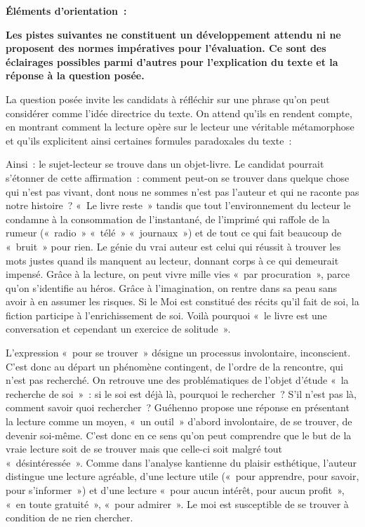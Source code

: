 {\bigskip

\textbf{Éléments d'orientation~:}

\textbf{Les pistes suivantes ne constituent un développement attendu ni ne proposent des
normes impératives pour l'évaluation. Ce sont des éclairages possibles parmi d'autres
pour l'explication du texte et la réponse à la question posée.}

La question posée invite les candidats à réfléchir sur une phrase qu'on peut considérer
comme l'idée directrice du texte. On attend qu'ils en rendent compte, en montrant comment la
lecture opère sur le lecteur une véritable métamorphose et qu'ils explicitent ainsi certaines
formules paradoxales du texte~:

Ainsi~: le sujet-lecteur se trouve dans un objet-livre. Le candidat pourrait s'étonner de cette
affirmation~: comment peut-on se trouver dans quelque chose qui n'est pas vivant, dont nous ne
sommes n'est pas l'auteur et qui ne raconte pas notre histoire~? «~Le livre reste~» tandis que tout
l'environnement du lecteur le condamne à la consommation de l'instantané, de l'imprimé qui
raffole de la rumeur («~radio~» «~télé~» «~journaux~») et de tout ce qui fait beaucoup de «~bruit~»
pour rien. Le génie du vrai auteur est celui qui réussit à trouver les mots justes quand ils manquent
au lecteur, donnant corps à ce qui demeurait impensé. Grâce à la lecture, on peut vivre mille vies
«~par procuration~», parce qu'on s'identifie au héros. Grâce à l'imagination, on rentre dans sa
peau sans avoir à en assumer les risques. Si le Moi est constitué des récits qu'il fait de soi, la
fiction participe à l'enrichissement de soi. Voilà pourquoi «~le livre est une conversation et
cependant un exercice de solitude~».

L'expression «~pour se trouver~» désigne un processus involontaire, inconscient. C'est
donc au départ un phénomène contingent, de l'ordre de la rencontre, qui n'est pas recherché. On
retrouve une des problématiques de l'objet d'étude «~la recherche de soi~»~: si le soi est déjà là,
pourquoi le rechercher~? S'il n'est pas là, comment savoir quoi rechercher~? Guéhenno propose
une réponse en présentant la lecture comme un moyen, «~un outil~» d'abord involontaire, de se
trouver, de devenir soi-même. C'est donc en ce sens qu'on peut comprendre que le but de la
vraie lecture soit de se trouver mais que celle-ci soit malgré tout «~désintéressée~». Comme dans
l'analyse kantienne du plaisir esthétique, l'auteur distingue une lecture agréable, d'une lecture
utile («~pour apprendre, pour savoir, pour s'informer~») et d'une lecture «~pour aucun intérêt, pour
aucun profit~», «~en toute gratuité~», «~pour admirer~». Le moi est susceptible de se trouver à
condition de ne rien chercher.

}
